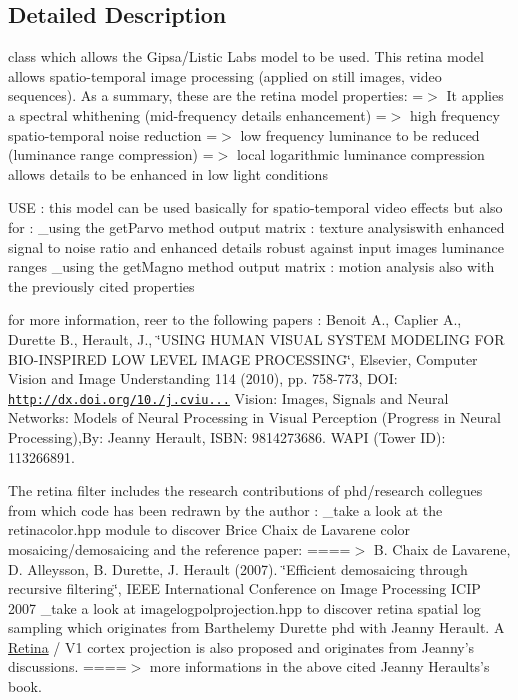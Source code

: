 \subsection{Detailed Description}
class which allows the Gipsa/\-Listic Labs model to be used. This retina model allows spatio-\/temporal image processing (applied on still images, video sequences). As a summary, these are the retina model properties\-: =$>$ It applies a spectral whithening (mid-\/frequency details enhancement) =$>$ high frequency spatio-\/temporal noise reduction =$>$ low frequency luminance to be reduced (luminance range compression) =$>$ local logarithmic luminance compression allows details to be enhanced in low light conditions

U\-S\-E \-: this model can be used basically for spatio-\/temporal video effects but also for \-: \-\_\-using the get\-Parvo method output matrix \-: texture analysiswith enhanced signal to noise ratio and enhanced details robust against input images luminance ranges \-\_\-using the get\-Magno method output matrix \-: motion analysis also with the previously cited properties

for more information, reer to the following papers \-: Benoit A., Caplier A., Durette B., Herault, J., \char`\"{}\-U\-S\-I\-N\-G H\-U\-M\-A\-N V\-I\-S\-U\-A\-L S\-Y\-S\-T\-E\-M M\-O\-D\-E\-L\-I\-N\-G F\-O\-R B\-I\-O-\/\-I\-N\-S\-P\-I\-R\-E\-D L\-O\-W L\-E\-V\-E\-L I\-M\-A\-G\-E P\-R\-O\-C\-E\-S\-S\-I\-N\-G\char`\"{}, Elsevier, Computer Vision and Image Understanding 114 (2010), pp. 758-\/773, D\-O\-I\-: \href{http://dx.doi.org/10.1016/j.cviu.2010.01.011}{\tt http\-://dx.\-doi.\-org/10./j.\-cviu...} Vision\-: Images, Signals and Neural Networks\-: Models of Neural Processing in Visual Perception (Progress in Neural Processing),By\-: Jeanny Herault, I\-S\-B\-N\-: 9814273686. W\-A\-P\-I (Tower I\-D)\-: 113266891.

The retina filter includes the research contributions of phd/research collegues from which code has been redrawn by the author \-: \-\_\-take a look at the retinacolor.\-hpp module to discover Brice Chaix de Lavarene color mosaicing/demosaicing and the reference paper\-: ====$>$ B. Chaix de Lavarene, D. Alleysson, B. Durette, J. Herault (2007). \char`\"{}\-Efficient demosaicing through recursive filtering\char`\"{}, I\-E\-E\-E International Conference on Image Processing I\-C\-I\-P 2007 \-\_\-take a look at imagelogpolprojection.\-hpp to discover retina spatial log sampling which originates from Barthelemy Durette phd with Jeanny Herault. A \hyperlink{classcv_1_1Retina}{Retina} / V1 cortex projection is also proposed and originates from Jeanny's discussions. ====$>$ more informations in the above cited Jeanny Heraults's book. 

